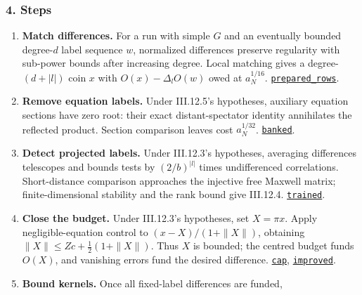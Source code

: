 \documentclass[
  letterpaper,
  11pt]{article}
\providecommand{\tightlist}{%
  \setlength{\itemsep}{0pt}\setlength{\parskip}{0pt}}
\begin{document}
\subsubsection{4. Steps}\label{steps-14}

\begin{enumerate}
\def\labelenumi{\arabic{enumi}.}
\tightlist
\item
  \textbf{Match differences.} For a run with simple \(G\) and an
  eventually bounded degree-\(d\) label sequence \(w\), normalized
  differences preserve regularity with sub-power bounds after increasing
  degree. Local matching gives a degree-\((d+|l|)\) coin \(x\) with
  \(O(x)-\Delta_lO(w)\) owed at \(a_N^{1/16}\).
  \href{https://github.com/yang-mills-group/OpenAI-YM-20261028/blob/3456e5e75cf8d4cd558955a5c7638fba2d68f464/YM/FullVolume/Paid.lean\#L47-L49}{\texttt{prepared\_rows}}.
\item
  \textbf{Remove equation labels.} Under III.12.5's hypotheses,
  auxiliary equation sections have zero root: their exact
  distant-spectator identity annihilates the reflected product. Section
  comparison leaves cost \(a_N^{1/32}\).
  \href{https://github.com/yang-mills-group/OpenAI-YM-20261028/blob/3456e5e75cf8d4cd558955a5c7638fba2d68f464/YM/FullVolume/Silent.lean\#L105-L115}{\texttt{banked}}.
\item
  \textbf{Detect projected labels.} Under III.12.3's hypotheses,
  averaging differences telescopes and bounds tests by \((2/b)^{|l|}\)
  times undifferenced correlations. Short-distance comparison approaches
  the injective free Maxwell matrix; finite-dimensional stability and
  the rank bound give III.12.4.
  \href{https://github.com/yang-mills-group/OpenAI-YM-20261028/blob/3456e5e75cf8d4cd558955a5c7638fba2d68f464/YM/FullVolume/Lit.lean\#L51-L91}{\texttt{trained}}.
\item
  \textbf{Close the budget.} Under III.12.3's hypotheses, set
  \(X=\pi x\). Apply negligible-equation control to \((x-X)/(1+\|X\|)\),
  obtaining \(\|X\|\le Zc+\tfrac12(1+\|X\|)\). Thus \(X\) is bounded;
  the centred budget funds \(O(X)\), and vanishing errors fund the
  desired difference.
  \href{https://github.com/yang-mills-group/OpenAI-YM-20261028/blob/3456e5e75cf8d4cd558955a5c7638fba2d68f464/YM/FullVolume/Moneys.lean\#L23-L63}{\texttt{cap}},
  \href{https://github.com/yang-mills-group/OpenAI-YM-20261028/blob/3456e5e75cf8d4cd558955a5c7638fba2d68f464/YM/FullVolume/Moneys.lean\#L69-L78}{\texttt{improved}}.
\item
  \textbf{Bound kernels.} Once all fixed-label differences are funded,

\end{enumerate}
\end{document}

